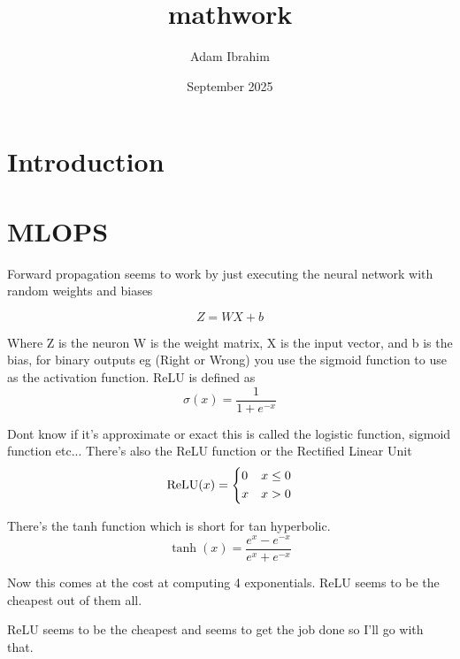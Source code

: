 \documentclass{article}
\title{mathwork}
\author{Adam Ibrahim}
\date{September 2025}
\begin{document}
\maketitle

\section{Introduction}
\section{MLOPS}
\par{Forward propagation seems to work by just executing the neural network with random weights and biases}

$$ Z=WX+b$$
\par {Where Z is the neuron W is the weight matrix, X is the input vector, and b is the bias, for binary outputs eg (Right or Wrong) you use the sigmoid function to use as the activation function. ReLU is defined as}
$$\sigma(x) = \frac{1}{1+e^{-x}}$$
\par{Dont know if it's approximate or exact this is called the logistic function, sigmoid function etc... There's also the ReLU function or the Rectified Linear Unit}\\

$$\text{ReLU}(x) = \begin{dcases}0 & x\leq0 \\ x & x > 0\end{dcases}$$
\par{There's the tanh function which is short for tan hyperbolic.}
$$\tanh(x) = \frac{e^x-e^{-x}}{e^x+e^{-x}}$$
\par{Now this comes at the cost at computing 4 exponentials. ReLU seems to be the 
cheapest out of them all.}\\

\par{ReLU seems to be the cheapest and seems to get the job done so I'll go with that. }
\end{document}
